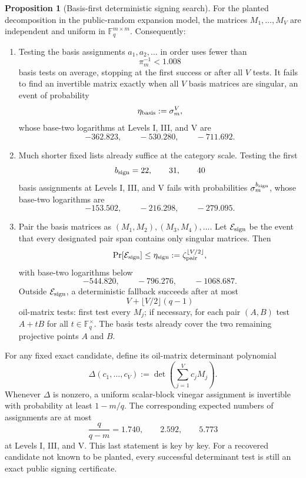\documentclass[11pt,a4paper]{article}
\theoremstyle{definition}
\newtheorem{proposition}[theorem]{Proposition}
\theoremstyle{remark}
\newcommand{\F}{\mathbb F}
\newcommand{\cE}{\mathcal E}
\begin{document}
\begin{proposition}[Basis-first deterministic signing search]\label{prop:signing-search}
For the planted decomposition in the public-random expansion model, the matrices
$M_1,\ldots,M_V$ are independent and uniform in $\F_q^{m\times m}$.
Consequently:
\begin{enumerate}
\item Testing the basis assignments $a_1,a_2,\ldots$ in order uses fewer than
\[
 \pi_m^{-1}<1.008
\]
basis tests on average, stopping at the first success or after all $V$ tests.  It fails to find an invertible matrix exactly when all $V$ basis matrices are singular, an event of probability
\begin{equation}\label{eq:basis-sign-failure}
 \eta_{\rm basis}:=\sigma_m^V,
\end{equation}
whose base-two logarithms at Levels I, III, and V are
\[
-362.823,\qquad-530.280,\qquad-711.692.
\]

\item Much shorter fixed lists already suffice at the category scale.  Testing the first
\[
 b_{\rm sign}=22,\qquad31,\qquad40
\]
basis assignments at Levels I, III, and V fails with probabilities $\sigma_m^{b_{\rm sign}}$, whose base-two logarithms are
\begin{equation}\label{eq:compact-sign-logs}
 -153.502,\qquad-216.298,\qquad-279.095.
\end{equation}

\item Pair the basis matrices as $(M_1,M_2),(M_3,M_4),\ldots$.  Let $\cE_{\rm sign}$ be the event that every designated pair span contains only singular matrices.  Then
\begin{equation}\label{eq:eta-sign}
 \Pr[\cE_{\rm sign}]
 \le \eta_{\rm sign}:=\zeta_{\rm pair}^{\lfloor V/2\rfloor},
\end{equation}
with base-two logarithms below
\[
-544.820,\qquad-796.276,\qquad-1068.687.
\]
Outside $\cE_{\rm sign}$, a deterministic fallback succeeds after at most
\begin{equation}\label{eq:signing-scan-count}
 V+\lfloor V/2\rfloor(q-1)
\end{equation}
oil-matrix tests: first test every $M_j$; if necessary, for each pair $(A,B)$ test $A+tB$ for all $t\in\F_q^\times$.  The basis tests already cover the two remaining projective points $A$ and $B$.
\end{enumerate}

For any fixed exact candidate, define its oil-matrix determinant polynomial
\[
\Delta(c_1,\ldots,c_V):=\det\!\left(\sum_{j=1}^V c_jM_j\right).
\]
Whenever $\Delta$ is nonzero, a uniform scalar-block vinegar assignment is invertible with probability at least $1-m/q$.  The corresponding expected numbers of assignments are at most
\[
\frac{q}{q-m}=1.740,\qquad2.592,\qquad5.773
\]
at Levels I, III, and V.  This last statement is key by key.  For a recovered candidate not known to be planted, every successful determinant test is still an exact public signing certificate.
\end{proposition}
\end{document}

